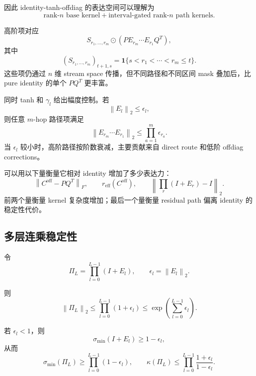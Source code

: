 \documentclass[UTF8,11pt]{ctexart}
\newcommand{\norm}[1]{\left\lVert #1 \right\rVert}
\begin{document}
因此 identity-tanh-offdiag 的表达空间可以理解为
\begin{equation}
  \text{rank-}n\text{ base kernel}
  +
  \text{interval-gated rank-}n\text{ path kernels}.
\end{equation}

高阶项对应
\begin{equation}
  S_{r_1,\dots,r_m}
  \odot
  (PE_{r_m}\cdots E_{r_1}Q^T),
\end{equation}
其中
\begin{equation}
  (S_{r_1,\dots,r_m})_{t+1,s}
  =
  \mathbf{1}\{s<r_1<\cdots<r_m\le t\}.
\end{equation}
这些项仍通过 $n$ 维 stream space 传播，但不同路径和不同区间 mask 叠加后，比 pure identity 的单个 $PQ^T$ 更丰富。

同时 tanh 和 $\gamma_l$ 给出幅度控制。若
\begin{equation}
  \norm{E_l}_2\le\epsilon_l,
\end{equation}
则任意 $m$-hop 路径项满足
\begin{equation}
  \norm{E_{r_m}\cdots E_{r_1}}_2
  \le
  \prod_{a=1}^{m}\epsilon_{r_a}.
\end{equation}
当 $\epsilon_l$ 较小时，高阶路径按阶数衰减，主要贡献来自 direct route 和低阶 offdiag corrections。

可以用以下量衡量它相对 identity 增加了多少表达力：
\begin{equation}
  \norm{C^{\mathrm{off}}-PQ^T}_F,
  \qquad
  r_{\mathrm{eff}}(C^{\mathrm{off}}),
  \qquad
  \norm{\prod_r(I+E_r)-I}_2.
\end{equation}
前两个量衡量 kernel 复杂度增加；最后一个量衡量 residual path 偏离 identity 的稳定性代价。

\subsection*{多层连乘稳定性}

令
\begin{equation}
  \Pi_L=
  \prod_{l=0}^{L-1}(I+E_l),
  \qquad
  \epsilon_l=\norm{E_l}_2.
\end{equation}

则
\begin{equation}
  \norm{\Pi_L}_2
  \le
  \prod_{l=0}^{L-1}(1+\epsilon_l)
  \le
  \exp\left(\sum_{l=0}^{L-1}\epsilon_l\right).
\end{equation}

若 $\epsilon_l<1$，则
\begin{equation}
  \sigma_{\min}(I+E_l)
  \ge
  1-\epsilon_l,
\end{equation}
从而
\begin{equation}
  \sigma_{\min}(\Pi_L)
  \ge
  \prod_{l=0}^{L-1}(1-\epsilon_l),
  \qquad
  \kappa(\Pi_L)
  \le
  \prod_{l=0}^{L-1}\frac{1+\epsilon_l}{1-\epsilon_l}.
\end{equation}
\end{document}
